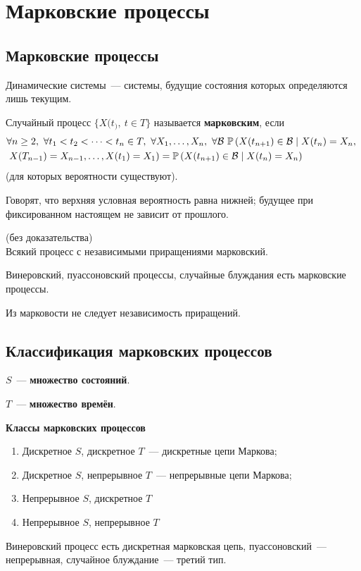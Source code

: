 \newpage
{}
\section{Марковские процессы}
\subsection{Марковские процессы}
Динамические системы~--- системы, будущие состояния которых определяются лишь
текущим.
\begin{Def}
    Случайный процесс $\{X(t_), \ t \in T\}$ называется \textbf{марковским},
    если
    \begin{align*}
      & \forall n \geq 2, \ \forall t_1 < t_2 < \dots < t_n \in T, \ \forall X_1, \dots, X_n, \ \forall \mathcal{B} \ \mathbb{P}\left( X(t_{n+1}) \in\mathcal{B} \mid X(t_n) = X_n, \right. \\
      & \left. X(T_{n-1}) = X_{n-1}, \dots, X(t_1) = X_1 \right) = \mathbb{P}\left( X(t_{n+1}) \in\mathcal{B} \mid X(t_n) = X_n \right)
    \end{align*}
    (для которых вероятности существуют).
\end{Def}
Говорят, что верхняя условная вероятность равна нижней; будущее при
фиксированном настоящем не зависит от прошлого.
\begin{theorem} (без доказательства)
    \\
    Всякий процесс с независимыми приращениями марковский.
\end{theorem}
\begin{corollary}
    Винеровский, пуассоновский процессы, случайные блуждания есть марковские процессы.
\end{corollary}
\begin{Note}
    Из марковости не следует независимость приращений.
\end{Note}
\subsection{Классификация марковских процессов}
\begin{Def}
    $S$~--- \textbf{множество состояний}.
\end{Def}
\begin{Def}
    $T$~--- \textbf{множество времён}.
\end{Def}
\textbf{Классы марковских процессов}
\begin{enumerate}
    \item Дискретное $S$, дискретное $T$~--- дискретные цепи Маркова;
    \item Дискретное $S$, непрерывное $T$~--- непрерывные цепи Маркова;
    \item Непрерывное $S$, дискретное $T$
    \item Непрерывное $S$, непрерывное $T$
\end{enumerate}
\begin{example}
    Винеровский процесс есть дискретная марковская цепь, пуассоновский~---
    непрерывная, случайное блуждание~--- третий тип.
\end{example}
